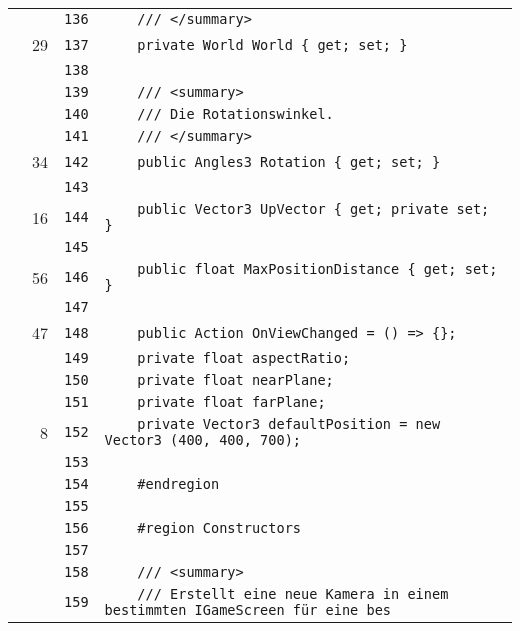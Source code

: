 \documentclass[a4paper,10pt]{article}
\begin{document}
\begin{longtable}[l]{lrrl}
\cellcolor{gray} &  & \verb~136~ & \verb~    /// </summary>~\\
\cellcolor{green} & 29 & \verb~137~ & \verb~    private World World { get; set; }~\\
\cellcolor{gray} &  & \verb~138~ & \verb~~\\
\cellcolor{gray} &  & \verb~139~ & \verb~    /// <summary>~\\
\cellcolor{gray} &  & \verb~140~ & \verb~    /// Die Rotationswinkel.~\\
\cellcolor{gray} &  & \verb~141~ & \verb~    /// </summary>~\\
\cellcolor{green} & 34 & \verb~142~ & \verb~    public Angles3 Rotation { get; set; }~\\
\cellcolor{gray} &  & \verb~143~ & \verb~~\\
\cellcolor{green} & 16 & \verb~144~ & \verb~    public Vector3 UpVector { get; private set; }~\\
\cellcolor{gray} &  & \verb~145~ & \verb~~\\
\cellcolor{green} & 56 & \verb~146~ & \verb~    public float MaxPositionDistance { get; set; }~\\
\cellcolor{gray} &  & \verb~147~ & \verb~~\\
\cellcolor{green} & 47 & \verb~148~ & \verb~    public Action OnViewChanged = () => {};~\\
\cellcolor{gray} &  & \verb~149~ & \verb~    private float aspectRatio;~\\
\cellcolor{gray} &  & \verb~150~ & \verb~    private float nearPlane;~\\
\cellcolor{gray} &  & \verb~151~ & \verb~    private float farPlane;~\\
\cellcolor{green} & 8 & \verb~152~ & \verb~    private Vector3 defaultPosition = new Vector3 (400, 400, 700);~\\
\cellcolor{gray} &  & \verb~153~ & \verb~~\\
\cellcolor{gray} &  & \verb~154~ & \verb~    #endregion~\\
\cellcolor{gray} &  & \verb~155~ & \verb~~\\
\cellcolor{gray} &  & \verb~156~ & \verb~    #region Constructors~\\
\cellcolor{gray} &  & \verb~157~ & \verb~~\\
\cellcolor{gray} &  & \verb~158~ & \verb~    /// <summary>~\\
\cellcolor{gray} &  & \verb~159~ & \verb~    /// Erstellt eine neue Kamera in einem bestimmten IGameScreen für eine bes~\\

\end{longtable}
\end{document}
